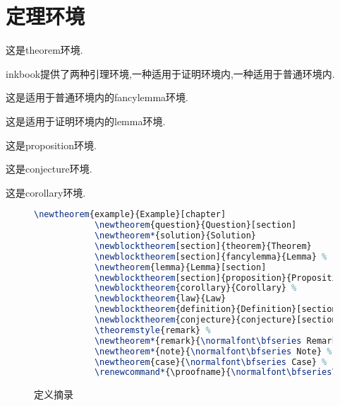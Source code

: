 \documentclass[en]{inkbook}
\begin{document}
    \section{定理环境}
    \begin{theorem}
        这是\textsf{theorem}环境.
    \end{theorem}
    \textsf{inkbook}提供了两种引理环境,一种适用于证明环境内,一种适用于普通环境内.
    \begin{fancylemma}
        这是适用于普通环境内的\textsf{fancylemma}环境.
    \end{fancylemma}
    \begin{lemma}
        这是适用于证明环境内的\textsf{lemma}环境.
    \end{lemma}
    \begin{proposition}
        这是\textsf{proposition}环境.
    \end{proposition}
    \begin{conjecture}
        这是\textsf{conjecture}环境.
    \end{conjecture}
    \begin{corollary}
        这是\textsf{corollary}环境.
    \end{corollary}
    \begin{figure}
        \begin{lstlisting}[language=TeX]
            \newtheorem{example}{Example}[chapter]
            \newtheorem{question}{Question}[section]
            \newtheorem*{solution}{Solution}
            \newblocktheorem[section]{theorem}{Theorem}
            \newblocktheorem[section]{fancylemma}{Lemma} %
            \newtheorem{lemma}{Lemma}[section]
            \newblocktheorem[section]{proposition}{Proposition} %
            \newblocktheorem{corollary}{Corollary} %
            \newblocktheorem{law}{Law}
            \newblocktheorem{definition}{Definition}[section] %
            \newblocktheorem{conjecture}{conjecture}[section] %
            \theoremstyle{remark} %
            \newtheorem*{remark}{\normalfont\bfseries Remark} %
            \newtheorem*{note}{\normalfont\bfseries Note} %
            \newtheorem{case}{\normalfont\bfseries Case} %
            \renewcommand*{\proofname}{\normalfont\bfseries\color{black}Proof} %
        \end{lstlisting}
        \caption{定义摘录}
    \end{figure}
\end{document}
